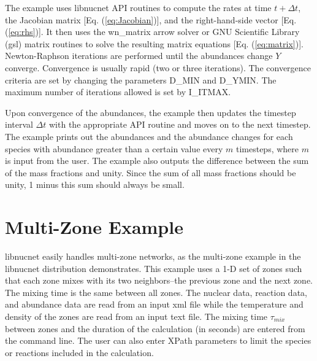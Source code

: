 \documentclass{article}    %
\begin{document}
The example uses libnucnet API routines to compute the rates at time
$t + \Delta t$, the Jacobian matrix [Eq. (\ref{eq:Jacobian})], and
the right-hand-side vector [Eq. (\ref{eq:rhs})]. It then uses the wn\_matrix
arrow solver or GNU
Scientific Library (gsl) matrix routines to solve the resulting
matrix equations [Eq. (\ref{eq:matrix})].  Newton-Raphson iterations
are performed until the abundances change $Y$ converge.  Convergence is
usually rapid (two or three iterations).  The convergence criteria are
set by changing the parameters D\_MIN and D\_YMIN.  The maximum number of
iterations allowed is set by I\_ITMAX.

Upon convergence of the abundances, the
example then updates the timestep interval $\Delta t$ with the
appropriate API routine and moves on to the next timestep.  The
example prints out the abundances and the abundance changes for each
species with abundance greater than a certain value every $m$
timesteps, where $m$ is input from the user.  The example also
outputs the difference between the sum of the mass fractions and
unity.  Since the sum of all mass fractions should be unity, 1 minus
this sum should always be small.

\section{Multi-Zone Example}

libnucnet easily handles multi-zone networks, as the multi-zone
example in the libnucnet distribution demonstrates.  This example
uses a 1-D set of zones such that each zone mixes with its two
neighbors--the previous zone and the next zone.
The mixing time is the same between all zones.  The
nuclear data, reaction data, and abundance data are read from an
input xml file while the temperature and density of the zones are
read from an input text file.  The mixing time $\tau_{mix}$ between
zones and the duration of the calculation (in seconds) are entered
from the command line.  The user can also enter XPath parameters to
limit the species or reactions included in the calculation.
\end{document}
